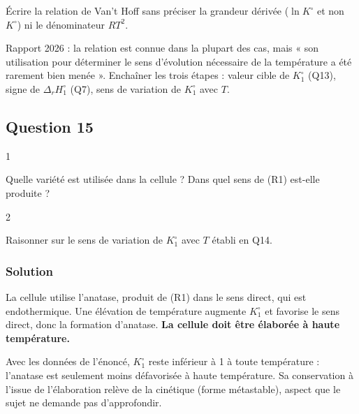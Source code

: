 \documentclass[11pt,a4paper]{article}
\begin{document}
\begin{piege}

Écrire la relation de Van't Hoff sans préciser la grandeur dérivée (\(\ln K^\circ\) et non \(K^\circ\)) ni le dénominateur \(RT^2\).

\end{piege}

\begin{jury}

Rapport 2026 : la relation est connue dans la plupart des cas, mais « son utilisation pour déterminer le sens d'évolution nécessaire de la température a été rarement bien menée ». Enchaîner les trois étapes : valeur cible de \(K^\circ_1\) (Q13), signe de \(\Delta_r H^\circ_1\) (Q7), sens de variation de \(K^\circ_1\) avec \(T\).

\end{jury}

\hypertarget{question-15}{%
\subsection{Question 15}\label{question-15}}

\begin{indication}{1}

Quelle variété est utilisée dans la cellule ? Dans quel sens de (R1) est-elle produite ?

\end{indication}

\begin{indication}{2}

Raisonner sur le sens de variation de \(K^\circ_1\) avec \(T\) établi en Q14.

\end{indication}

\hypertarget{solution-14}{%
\subsubsection{Solution}\label{solution-14}}

La cellule utilise l'anatase, produit de (R1) dans le sens direct, qui est endothermique. Une élévation de température augmente \(K^\circ_1\) et favorise le sens direct, donc la formation d'anatase. \textbf{La cellule doit être élaborée à haute température.}

Avec les données de l'énoncé, \(K^\circ_1\) reste inférieur à 1 à toute température : l'anatase est seulement moins défavorisée à haute température. Sa conservation à l'issue de l'élaboration relève de la cinétique (forme métastable), aspect que le sujet ne demande pas d'approfondir.
\end{document}
